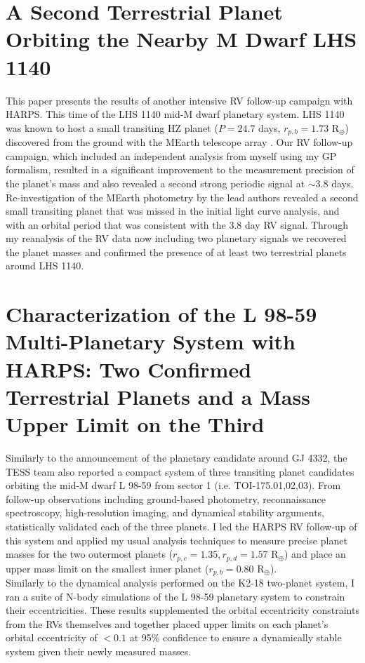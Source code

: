 \section{A Second Terrestrial Planet Orbiting the Nearby M Dwarf LHS 1140
  \citep{ment19}}
This paper presents the results of another intensive RV follow-up campaign with
HARPS. This time of the LHS 1140 mid-M dwarf planetary system. LHS 1140 was known to
host a small transiting HZ planet ($P=24.7$ days, $r_{p,b}=1.73$ R$_{\oplus}$)
discovered from the ground with the MEarth
telescope array \citep{dittmann17a}. Our RV follow-up campaign, which included
an independent analysis from myself using my GP formalism, resulted in a
significant improvement to the measurement precision of the planet's mass and
also revealed a second strong periodic signal at $\sim 3.8$ days. Re-investigation of
the MEarth photometry by the lead authors revealed a second small transiting
planet that was missed in the initial light curve analysis, and with an orbital
period that was consistent with the 3.8 day RV signal. Through my reanalysis of
the RV data now including two planetary signals we recovered the planet masses
and confirmed the presence of at least two terrestrial planets around LHS 1140.

\section[Three terrestrial planets around L 98-59]{Characterization of the L 98-59 Multi-Planetary System with HARPS:
  Two Confirmed Terrestrial Planets and a Mass Upper Limit on the Third
  \citep{cloutier19c}}
Similarly to the announcement of the planetary candidate around GJ 4332, the
TESS team also reported a compact system of three transiting planet
candidates orbiting the mid-M dwarf L 98-59 from sector 1 (i.e.
TOI-175.01,02,03). From follow-up observations including ground-based
photometry, reconnaissance spectroscopy, high-resolution imaging, and
dynamical stability arguments, \cite{kostov19} statistically validated each of
the three planets. I led the HARPS RV follow-up of this system and applied my
usual analysis techniques to measure precise planet masses for the two outermost
planets ($r_{p,c}=1.35, r_{p,d}=1.57$ R$_{\oplus}$) and place an upper mass limit
on the smallest inner planet ($r_{p,b}=0.80$ R$_{\oplus}$). \\

Similarly to the dynamical analysis performed on the K2-18 two-planet system, I
ran a suite of N-body simulations of the L 98-59 planetary system to constrain
their eccentricities. These results supplemented the orbital eccentricity
constraints from the RVs themselves and together placed upper limits on each
planet's orbital eccentricity of $< 0.1$ at 95\% confidence to ensure a
dynamically stable system given their newly measured masses.


